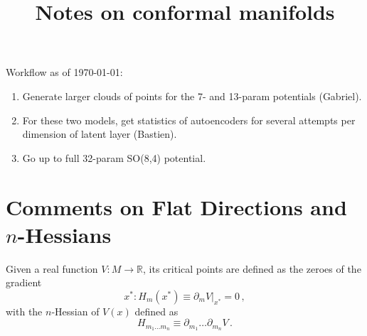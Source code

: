 \documentclass[11pt]{article}
\title{Notes on conformal manifolds}
\author{}
\begin{document}
\maketitle


Workflow as of \today:
\begin{enumerate}
	\item Generate larger clouds of points for the 7- and 13-param potentials (Gabriel).
	\item For these two models, get statistics of autoencoders for several attempts per dimension of latent layer (Bastien).
	\item Go up to full 32-param SO(8,4) potential.
\end{enumerate}

\tableofcontents


\section{Comments on Flat Directions and $n$-Hessians} \label{sec: hessians}

Given a real function $V: M \rightarrow \mathbb R$, its critical points are defined as the zeroes of the gradient
%
\begin{equation}
	x^*: H_{m}(x^*)\equiv\partial_mV\big\vert_{x^*}=0\,,
\end{equation}
%
with the $n$-Hessian of $V(x)$ defined as
%
\begin{equation}
	H_{m_1\dots m_n}\equiv\partial_{m_1}\dots\partial_{m_n}V\,.
\end{equation}
%
\end{document}
